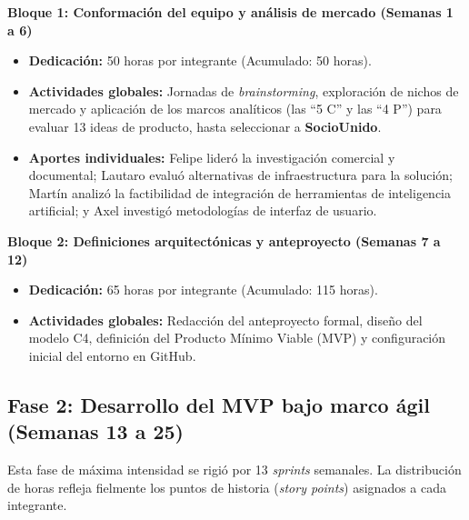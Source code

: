\textbf{Bloque 1: Conformación del equipo y análisis de mercado (Semanas 1 a 6)}
\begin{itemize}
    \item \textbf{Dedicación:} 50 horas por integrante (Acumulado: 50 horas).
    \item \textbf{Actividades globales:} Jornadas de \textit{brainstorming}, exploración de nichos de mercado y aplicación de los marcos analíticos (las ``5 C'' y las ``4 P'') para evaluar 13 ideas de producto, hasta seleccionar a \textbf{SocioUnido}.
    \item \textbf{Aportes individuales:} Felipe lideró la investigación comercial y documental; Lautaro evaluó alternativas de infraestructura para la solución; Martín analizó la factibilidad de integración de herramientas de inteligencia artificial; y Axel investigó metodologías de interfaz de usuario.
\end{itemize}

\textbf{Bloque 2: Definiciones arquitectónicas y anteproyecto (Semanas 7 a 12)}
\begin{itemize}
    \item \textbf{Dedicación:} 65 horas por integrante (Acumulado: 115 horas).
    \item \textbf{Actividades globales:} Redacción del anteproyecto formal, diseño del modelo C4, definición del Producto Mínimo Viable (MVP) y configuración inicial del entorno en GitHub.
\end{itemize}

\subsection{Fase 2: Desarrollo del MVP bajo marco ágil (Semanas 13 a 25)}

Esta fase de máxima intensidad se rigió por 13 \textit{sprints} semanales. La distribución de horas refleja fielmente los puntos de historia (\textit{story points}) asignados a cada integrante.

